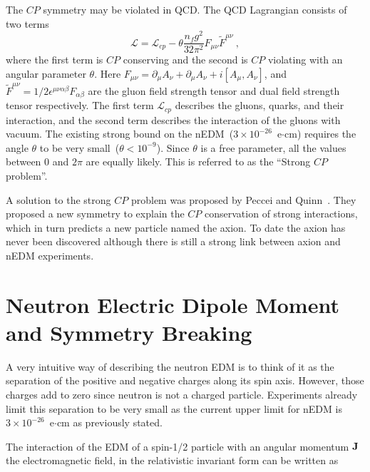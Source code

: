 The $CP$ symmetry may be violated in QCD. The QCD Lagrangian consists
of two terms
\begin{equation}
  \label{eqn:qcd}
\mathscr{L}= \mathscr{L}_{cp} - \theta \frac{n_f g^2}{32 \pi^2} F_{\mu \nu} \tilde{F}^{\mu \nu}~,
\end{equation}
where the first term is $CP$ conserving and the second is $CP$
violating with an angular parameter $\theta$. Here
$F_{\mu \nu} = \partial_\mu A_\nu + \partial_\mu A_\nu +
i[A_\mu,A_\nu]$, and
$\tilde{F}^{\mu \nu}=1/2 \epsilon^{\mu \nu \alpha \beta}F_{\alpha
  \beta}$ are the gluon field strength tensor and dual field strength
tensor respectively. The first term $\mathscr{L}_{cp}$ describes the
gluons, quarks, and their interaction, and the second term describes
the interaction of the gluons with vacuum. The existing strong bound
on the nEDM~($3 \times 10^{-26}$~e$\cdot$cm) requires the angle
$\theta$ to be very small~($\theta < 10^{-9}$). Since $\theta$ is a
free parameter, all the values between 0 and $2\pi$ are equally
likely. This is referred to as the ``Strong $CP$ problem''.

A solution to the strong $CP$ problem was proposed by Peccei and
Quinn~\cite{Peccei1977}. They proposed a new symmetry to explain the
$CP$ conservation of strong interactions, which in turn predicts a new
particle named the axion. To date the axion has never been discovered
although there is still a strong link between axion and nEDM
experiments.

\section{Neutron Electric Dipole Moment and Symmetry Breaking}

A very intuitive way of describing the neutron EDM is to think of it
as the separation of the positive and negative charges along its spin
axis. However, those charges add to zero since neutron is not a
charged particle. Experiments already limit this separation to be very
small as the current upper limit for nEDM is
$3 \times 10^{-26}$~e$\cdot$cm as previously stated.


The interaction of the EDM of a spin-1/2 particle with an angular
momentum $\bf{J}$ the electromagnetic field, in the relativistic
invariant form can be written as

